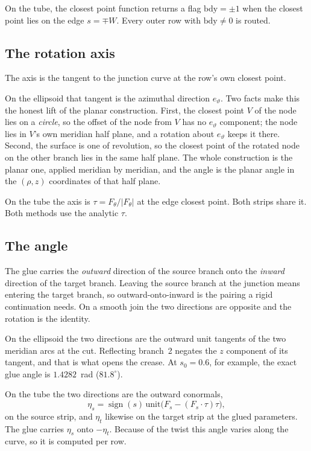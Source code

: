 On the tube, the closest point function returns a flag
$\mathrm{bdy}=\pm1$ when the closest point lies on the edge $s=\mp W$.
Every outer row with $\mathrm{bdy}\neq0$ is routed.

\subsection{The rotation axis}

The axis is the tangent to the junction curve at the row's own closest
point.

On the ellipsoid that tangent is the azimuthal direction
$e_\vartheta$. Two facts make this the honest lift of the planar
construction. First, the closest point $V$ of the node lies on a
\emph{circle}, so the offset of the node from $V$ has no $e_\vartheta$
component; the node lies in $V$'s own meridian half plane, and a rotation
about $e_\vartheta$ keeps it there. Second, the surface is one of
revolution, so the closest point of the rotated node on the other branch
lies in the same half plane. The whole construction is the planar one,
applied meridian by meridian, and the angle is the planar angle in the
$(\rho,z)$ coordinates of that half plane.

On the tube the axis is $\tau = F_\theta/|F_\theta|$ at the edge closest
point. Both strips share it. Both methods use the analytic $\tau$.

\subsection{The angle}

The glue carries the \emph{outward} direction of the source branch onto
the \emph{inward} direction of the target branch. Leaving the source
branch at the junction means entering the target branch, so
outward-onto-inward is the pairing a rigid continuation needs. On a
smooth join the two directions are opposite and the rotation is the
identity.

On the ellipsoid the two directions are the outward unit tangents of the
two meridian arcs at the cut. Reflecting branch~2 negates the $z$
component of its tangent, and that is what opens the crease. At
$s_0=0.6$, for example, the exact glue angle is $1.4282$~rad
($81.8^\circ$).

On the tube the two directions are the outward conormals,
\begin{equation}
  \eta_s = \operatorname{sign}(s)\,
  \mathrm{unit}\bigl(F_s - (F_s\!\cdot\!\tau)\tau\bigr),
\end{equation}
on the source strip, and $\eta_t$ likewise on the target strip at the
glued parameters. The glue carries $\eta_s$ onto $-\eta_t$. Because of
the twist this angle varies along the curve, so it is computed per row.

